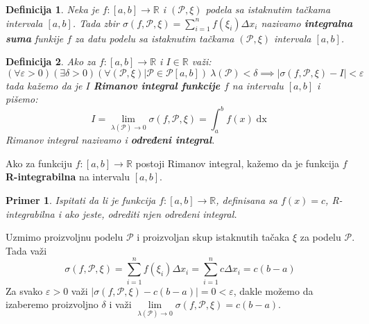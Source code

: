 \documentclass{article}
\newtheorem{definicija}{Definicija}[section]
\newtheorem{prim}{Primer}[section]
\DeclareMathOperator{\dx}{dx}
\begin{document}
\begin{defbox}
    \label{definicija_2.2}
    \begin{definicija}
        Neka je $f:\left[a,b\right]\longrightarrow\mathbb{R}$ i $\left(\mathcal{P},\xi\right)$ podela sa istaknutim tačkama intervala $\left[a,b\right]$. Tada zbir
        $\displaystyle\sigma\left(f,\mathcal{P},\xi\right)=\sum_{i=1}^{n}f\left(\xi_i\right)\varDelta x_i$ nazivamo \textbf{integralna suma} funkije $f$ za datu podelu
        sa istaknutim tačkama $\left(\mathcal{P},\xi\right)$ intervala $\left[a,b\right]$.
    \end{definicija}
\end{defbox}

\begin{defbox}
    \label{definicija_2.3}
    \begin{definicija}
        Ako za $f: \left[a,b\right]\longrightarrow\mathbb{R}$ i $I\in\mathbb{R}$ važi:
        $$\left(\forall\varepsilon>0\right)\left(\exists\delta>0\right)\left(\forall\left(\mathcal{P},\xi\right)\big|\mathcal{P}\in\mathcal{P}\left[a,b\right]\right)\ \lambda\left(\mathcal{P}\right)<\delta\implies|\sigma\left(f,\mathcal{P},\xi\right)-I|<\varepsilon$$
        tada kažemo da je $I$ \textbf{Rimanov integral funkcije $f$} na intervalu $\left[a,b\right]$ i pišemo:
        $$I=\lim\limits_{\lambda\left(\mathcal{P}\right)\rightarrow 0}\sigma\left(f,\mathcal{P},\xi\right)=\int_{a}^{b}f\left(x\right)\dx$$
        Rimanov integral nazivamo i \textbf{određeni integral}.
    \end{definicija}
\end{defbox}

Ako za funkciju $f:\left[a,b\right]\longrightarrow\mathbb{R}$ postoji Rimanov integral, kažemo da je funkcija $f$ \textbf{R-integrabilna} na intervalu $\left[a,b\right]$.

\begin{primbox}
    \label{primer_2.1}
    \begin{prim}
        Ispitati da li je funkcija $f: \left[a,b\right]\longrightarrow\mathbb{R}$, definisana sa $f\left(x\right)=c$, R-integrabilna i ako jeste, odrediti njen određeni integral.
    \end{prim}
    Uzmimo proizvoljnu podelu $\mathcal{P}$ i proizvoljan skup istaknutih tačaka $\xi$ za podelu $\mathcal{P}$. Tada važi
    \begin{equation}
        \label{primer_2.1:eq1}
        \sigma\left(f,\mathcal{P},\xi\right)=\sum_{i=1}^{n} f\left(\xi_i\right)\Delta x_i=\sum_{i=1}^{n} c\Delta x_i=c\left(b-a\right)
    \end{equation}
    Za svako $\varepsilon>0$ važi $\left|\sigma\left(f,\mathcal{P},\xi\right)-c(b-a)\right|=0<\varepsilon$, dakle možemo da
    izaberemo proizvoljno $\delta$ i važi
    $\lim\limits_{\lambda\left(\mathcal{P}\right)\rightarrow0} \sigma\left(f,\mathcal{P},\xi\right)=c(b-a)$.
\end{primbox}
\end{document}
